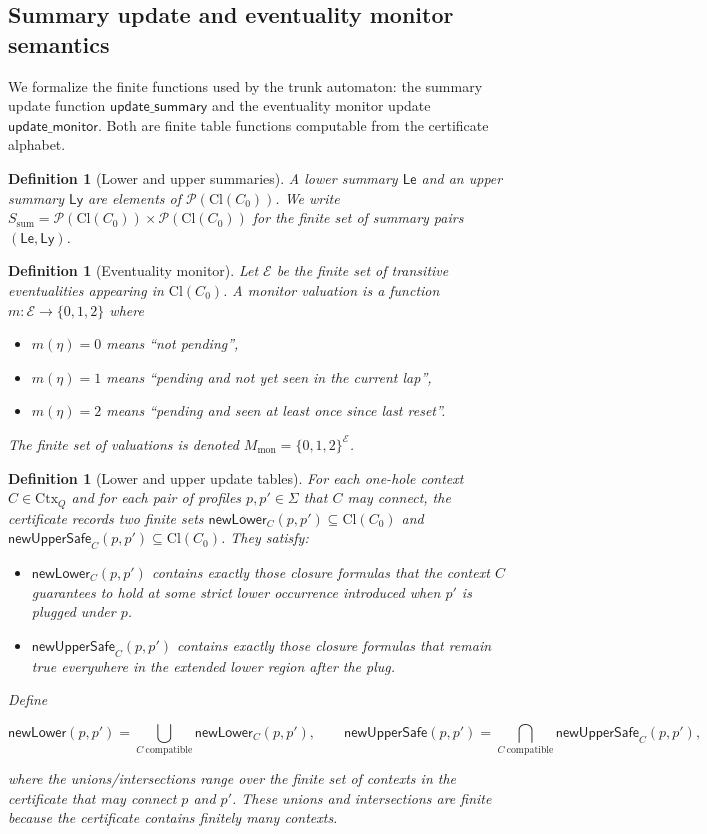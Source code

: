 \documentclass[11pt]{article}
\newcommand{\Cl}{\mathrm{Cl}}
\newtheorem{definition}[theorem]{Definition}
\begin{document}
\subsection{Summary update and eventuality monitor semantics}
\label{subsec:summary-monitor}

We formalize the finite functions used by the trunk automaton: the summary
update function $\mathsf{update\_summary}$ and the eventuality monitor update
$\mathsf{update\_monitor}$. Both are finite table functions computable from
the certificate alphabet.

\begin{definition}[Lower and upper summaries]
A lower summary $\mathsf{Le}$ and an upper summary $\mathsf{Ly}$ are elements
of $\mathcal{P}(\Cl(C_0))$. We write
$S_{\mathrm{sum}}=\mathcal{P}(\Cl(C_0))\times\mathcal{P}(\Cl(C_0))$ for the
finite set of summary pairs $(\mathsf{Le},\mathsf{Ly})$.
\end{definition}

\begin{definition}[Eventuality monitor]
Let $\mathcal{E}$ be the finite set of transitive eventualities appearing in
$\Cl(C_0)$. A monitor valuation is a function $m:\mathcal{E}\to\{0,1,2\}$ where
\begin{itemize}
  \item $m(\eta)=0$ means ``not pending'',
  \item $m(\eta)=1$ means ``pending and not yet seen in the current lap'',
  \item $m(\eta)=2$ means ``pending and seen at least once since last reset''.
\end{itemize}
The finite set of valuations is denoted $M_{\mathrm{mon}}=\{0,1,2\}^{\mathcal{E}}$.
\end{definition}

\begin{definition}[Lower and upper update tables]
For each one-hole context $C\in\mathrm{Ctx}_Q$ and for each pair of profiles
$p,p'\in\Sigma$ that $C$ may connect, the certificate records two finite sets
\(\mathsf{newLower}_C(p,p')\subseteq\Cl(C_0)\) and
\(\mathsf{newUpperSafe}_C(p,p')\subseteq\Cl(C_0)\). They satisfy:
\begin{itemize}
  \item $\mathsf{newLower}_C(p,p')$ contains exactly those closure formulas
    that the context $C$ guarantees to hold at some strict lower occurrence
    introduced when $p'$ is plugged under $p$.
  \item $\mathsf{newUpperSafe}_C(p,p')$ contains exactly those closure formulas
    that remain true everywhere in the extended lower region after the plug.
\end{itemize}
Define


\[
\mathsf{newLower}(p,p')=\bigcup_{C\ \text{compatible}} \mathsf{newLower}_C(p,p'),
\qquad
\mathsf{newUpperSafe}(p,p')=\bigcap_{C\ \text{compatible}} \mathsf{newUpperSafe}_C(p,p'),
\]


where the unions/intersections range over the finite set of contexts in the
certificate that may connect $p$ and $p'$. These unions and intersections are
finite because the certificate contains finitely many contexts.
\end{definition}
\end{document}
